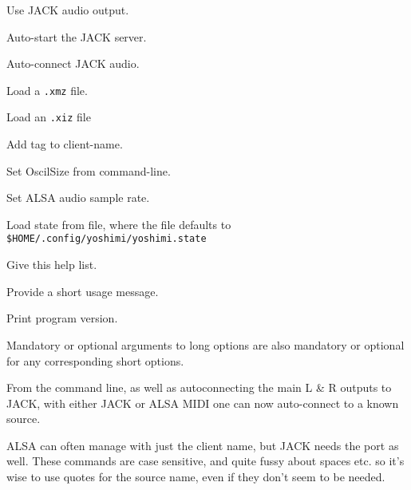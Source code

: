       Use JACK audio output.

      Auto-start the JACK server.

      Auto-connect JACK audio.

      Load a \texttt{.xmz} file.

      Load an \texttt{.xiz} file

      Add tag to client-name.

      Set OscilSize from command-line.

      Set ALSA audio sample rate.

      Load state from file, where the file defaults to
      \texttt{\$HOME/.config/yoshimi/yoshimi.state}

      Give this help list.

      Provide a short usage message.

      Print program version.

   Mandatory or optional arguments to long options are also mandatory or optional
   for any corresponding short options.

   From the command line, as well as autoconnecting the main L \& R outputs
   to JACK, with either JACK or ALSA MIDI one can now auto-connect to a
   known source.

   ALSA can often manage with just the client name, but JACK needs the port
   as well. These commands are case sensitive, and quite fussy about spaces
   etc. so it's wise to use quotes for the source name, even if they don't
   seem to be needed.

